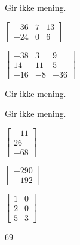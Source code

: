 \begin{losning}

\begin{punkt}
Gir ikke mening.
\end{punkt}

\begin{punkt}
$\begin{bmatrix}
-36 & 7 & 13\\
-24 & 0 & 6
\end{bmatrix}$
\end{punkt}

\begin{punkt}
$\begin{bmatrix}
-38 & 3 & 9\\
14 & 11 & 5\\
-16 & -8 & -36
\end{bmatrix}$
\end{punkt}

\begin{punkt}
Gir ikke mening.
\end{punkt}

\begin{punkt}
Gir ikke mening.
\end{punkt}

\begin{punkt}
$\begin{bmatrix}
-11\\
26\\
-68
\end{bmatrix}$
\end{punkt}




\begin{punkt}
$\begin{bmatrix}
-290\\
-192
\end{bmatrix}$
\end{punkt}


\begin{punkt}
$\begin{bmatrix}
1 & 0\\
2 & 0\\
5 & 3
\end{bmatrix}$
\end{punkt}

\begin{punkt}
69
\end{punkt}


\end{losning}

